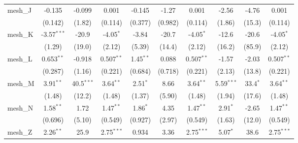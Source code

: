 \begin{tabular}{lccccccccc}
   mesh\_J                                                     & -0.135         & -0.099        & 0.001          & -0.145         & -1.27        & 0.001          & -2.56          & -4.76         & 0.001\\   
                                                               & (0.142)        & (1.82)        & (0.114)        & (0.377)        & (0.982)      & (0.114)        & (1.86)         & (15.3)        & (0.114)\\   
   mesh\_K                                                     & -3.57$^{***}$  & -20.9         & -4.05$^{*}$    & -3.84          & -20.7        & -4.05$^{*}$    & -12.6          & -20.6         & -4.05$^{*}$\\   
                                                               & (1.29)         & (19.0)        & (2.12)         & (5.39)         & (14.4)       & (2.12)         & (16.2)         & (85.9)        & (2.12)\\   
   mesh\_L                                                     & 0.653$^{**}$   & -0.918        & 0.507$^{**}$   & 1.45$^{**}$    & 0.088        & 0.507$^{**}$   & -1.57          & -2.03         & 0.507$^{**}$\\   
                                                               & (0.287)        & (1.16)        & (0.221)        & (0.684)        & (0.718)      & (0.221)        & (2.13)         & (13.8)        & (0.221)\\   
   mesh\_M                                                     & 3.91$^{**}$    & 40.5$^{***}$  & 3.64$^{**}$    & 2.51$^{*}$     & 8.66         & 3.64$^{**}$    & 5.59$^{***}$   & 33.4$^{*}$    & 3.64$^{**}$\\   
                                                               & (1.48)         & (12.2)        & (1.48)         & (1.37)         & (5.90)       & (1.48)         & (1.94)         & (17.6)        & (1.48)\\   
   mesh\_N                                                     & 1.58$^{**}$    & 1.72          & 1.47$^{**}$    & 1.86$^{*}$     & 4.35         & 1.47$^{**}$    & 2.91$^{*}$     & -2.65         & 1.47$^{**}$\\   
                                                               & (0.696)        & (5.10)        & (0.549)        & (0.927)        & (2.97)       & (0.549)        & (1.63)         & (12.0)        & (0.549)\\   
   mesh\_Z                                                     & 2.26$^{**}$    & 25.9          & 2.75$^{***}$   & 0.934          & 3.36         & 2.75$^{***}$   & 5.07$^{*}$     & 38.6          & 2.75$^{***}$\\   

\end{tabular}

